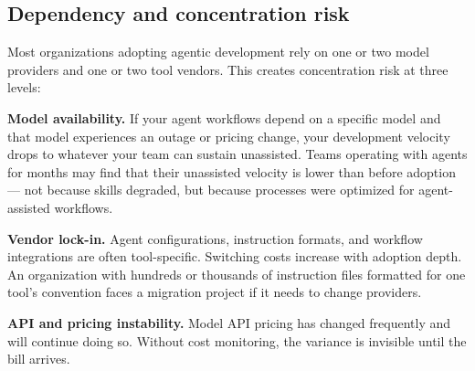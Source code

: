 \documentclass[
  a4paper,
  DIV=11,
  numbers=noendperiod]{scrreprt}
\begin{document}
\subsection{Dependency and concentration
risk}\label{dependency-and-concentration-risk}

Most organizations adopting agentic development rely on one or two model
providers and one or two tool vendors. This creates concentration risk
at three levels:

\textbf{Model availability.} If your agent workflows depend on a
specific model and that model experiences an outage or pricing change,
your development velocity drops to whatever your team can sustain
unassisted. Teams operating with agents for months may find that their
unassisted velocity is lower than before adoption --- not because skills
degraded, but because processes were optimized for agent-assisted
workflows.

\textbf{Vendor lock-in.} Agent configurations, instruction formats, and
workflow integrations are often tool-specific. Switching costs increase
with adoption depth. An organization with hundreds or thousands of
instruction files formatted for one tool's convention faces a migration
project if it needs to change providers.

\textbf{API and pricing instability.} Model API pricing has changed
frequently and will continue doing so. Without cost monitoring, the
variance is invisible until the bill arrives.
\end{document}
